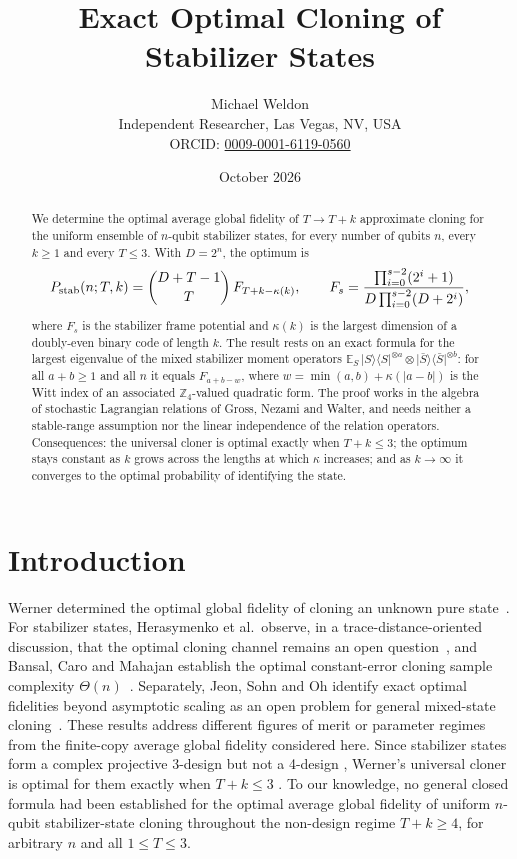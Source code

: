 \documentclass[11pt]{article}
\title{Exact Optimal Cloning of Stabilizer States}
\author{Michael Weldon\\[2pt]
\small Independent Researcher, Las Vegas, NV, USA\\
\small ORCID: \href{https://orcid.org/0009-0001-6119-0560}{0009-0001-6119-0560}}
\date{October 2026}
\newcommand{\E}{\mathbb{E}}
\newcommand{\ket}[1]{\lvert #1\rangle}
\newcommand{\bra}[1]{\langle #1\rvert}
\theoremstyle{definition}
\theoremstyle{remark}
\begin{document}
\maketitle

\begin{abstract}
We determine the optimal average global fidelity of $T\to T+k$ approximate cloning for the uniform ensemble of
$n$-qubit stabilizer states, for every number of qubits $n$, every $k\ge1$ and every $T\le3$. With $D=2^n$, the
optimum is
\[
P_{\rm stab}(n;T,k)=\binom{D+T-1}{T}\,F_{T+k-\kappa(k)},\qquad
F_s=\frac{\prod_{i=0}^{s-2}(2^i+1)}{D\prod_{i=0}^{s-2}(D+2^i)},
\]
where $F_s$ is the stabilizer frame potential and $\kappa(k)$ is the largest dimension of a doubly-even binary code
of length $k$. The result rests on an exact formula for the largest eigenvalue of the mixed stabilizer moment
operators $\E_S\,\ket S\!\bra S^{\otimes a}\otimes\ket{\bar S}\!\bra{\bar S}^{\otimes b}$: for all $a+b\ge1$ and all
$n$ it equals $F_{a+b-w}$, where $w=\min(a,b)+\kappa(|a-b|)$ is the Witt index of an associated $\mathbb Z_4$-valued
quadratic form. The proof works in the algebra of stochastic Lagrangian relations of Gross, Nezami and Walter, and
needs neither a stable-range assumption nor the linear independence of the relation operators. Consequences: the
universal cloner is optimal exactly when $T+k\le3$; the optimum stays constant as $k$ grows across the lengths at
which $\kappa$ increases; and as $k\to\infty$ it converges to the optimal probability of identifying the state.
\end{abstract}

\section{Introduction}
Werner determined the optimal global fidelity of cloning an unknown pure state~\cite{Werner1998}. For stabilizer states, Herasymenko et al.\ observe, in a trace-distance-oriented
discussion, that the optimal cloning channel remains an open question~\cite{Herasymenko2026}, and Bansal, Caro and
Mahajan establish the optimal constant-error cloning sample complexity $\Theta(n)$~\cite{Bansal2026}. Separately,
Jeon, Sohn and Oh identify exact optimal fidelities beyond asymptotic scaling as an open problem for general
mixed-state cloning~\cite{JeonSohnOh2026}. These results address different figures of merit or parameter regimes
from the finite-copy average global fidelity considered here. Since stabilizer states form a complex projective 3-design but not a 4-design
\cite{KuengGross2015,ZKGG2016}, Werner's universal cloner is optimal for them exactly when $T+k\le3$
\cite{WeldonP2}. To our knowledge, no general closed formula had been established for the optimal average global fidelity of
uniform $n$-qubit stabilizer-state cloning throughout the non-design regime $T+k\ge4$, for arbitrary $n$ and all
$1\le T\le3$.
\end{document}
